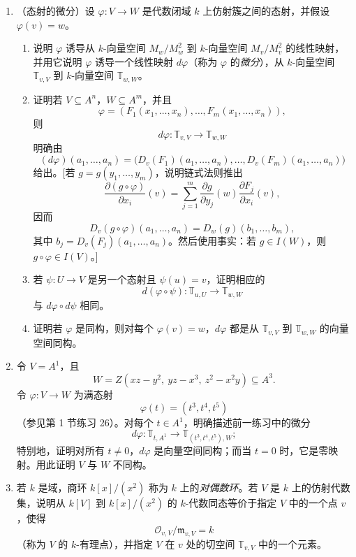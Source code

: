 \begin{enumerate}[label=\arabic*.]
	\item （态射的微分）设 $\varphi:V\to W$ 是代数闭域 $k$ 上仿射簇之间的态射，并假设 $\varphi(v)=w$。
	\begin{enumerate}[label=(\alph*)]
		\item 说明 $\varphi$ 诱导从 $k$-向量空间 $M_w/M_w^2$ 到 $k$-向量空间 $M_v/M_v^2$ 的线性映射，并用它说明 $\varphi$ 诱导一个线性映射 $d\varphi$（称为 $\varphi$ 的\emph{微分}），从 $k$-向量空间 $\mathbb T_{v,V}$ 到 $k$-向量空间 $\mathbb T_{w,W}$。
		\item 证明若 $V\subseteq A^n$，$W\subseteq A^m$，并且
		\[
		\varphi=(F_1(x_1,\ldots,x_n),\ldots,F_m(x_1,\ldots,x_n)),
		\]
		则
		\[
		d\varphi:\mathbb T_{v,V}\longrightarrow\mathbb T_{w,W}
		\]
		明确由
		\[
		(d\varphi)(a_1,
		\ldots,a_n)=
		\bigl(D_v(F_1)(a_1,
		\ldots,a_n),
		\ldots,
		D_v(F_m)(a_1,
		\ldots,a_n)\bigr)
		\]
		给出。[若 $g=g(y_1,
		\ldots,y_m)$，说明链式法则推出
		\[
		\frac{\partial(g\circ\varphi)}{\partial x_i}(v)
		=\sum_{j=1}^m
		\frac{\partial g}{\partial y_j}(w)
		\frac{\partial F_j}{\partial x_i}(v),
		\]
		因而
		\[
		D_v(g\circ\varphi)(a_1,
		\ldots,a_n)=D_w(g)(b_1,
		\ldots,b_m),
		\]
		其中 $b_j=D_v(F_j)(a_1,
		\ldots,a_n)$。然后使用事实：若 $g\in I(W)$，则 $g\circ\varphi\in I(V)$。]
		\item 若 $\psi:U\to V$ 是另一个态射且 $\psi(u)=v$，证明相应的
		\[
		d(\varphi\circ\psi):\mathbb T_{u,U}\to\mathbb T_{w,W}
		\]
		与 $d\varphi\circ d\psi$ 相同。
		\item 证明若 $\varphi$ 是同构，则对每个 $\varphi(v)=w$，$d\varphi$ 都是从 $\mathbb T_{v,V}$ 到 $\mathbb T_{w,W}$ 的向量空间同构。
	\end{enumerate}
	
	\item 令 $V=A^1$，且
	\[
	W=Z(xz-y^2,\ yz-x^3,\ z^2-x^2y)\subseteq A^3.
	\]
	令 $\varphi:V\to W$ 为满态射
	\[
	\varphi(t)=(t^3,t^4,t^5)
	\]
	（参见第 1 节练习 26）。对每个 $t\in A^1$，明确描述前一练习中的微分
	\[
	d\varphi:\mathbb T_{t,A^1}\to\mathbb T_{(t^3,t^4,t^5),W};
	\]
	特别地，证明对所有 $t\ne0$，$d\varphi$ 是向量空间同构；而当 $t=0$ 时，它是零映射。用此证明 $V$ 与 $W$ 不同构。
	
	\item 若 $k$ 是域，商环 $k[x]/(x^2)$ 称为 $k$ 上的\emph{对偶数环}。若 $V$ 是 $k$ 上的仿射代数集，说明从 $k[V]$ 到 $k[x]/(x^2)$ 的 $k$-代数同态等价于指定 $V$ 中的一个点 $v$，使得
	\[
	\mathcal O_{v,V}/\mathfrak m_{v,V}=k
	\]
	（称为 $V$ 的 $k$-有理点），并指定 $V$ 在 $v$ 处的切空间 $\mathbb T_{v,V}$ 中的一个元素。
	

\end{enumerate}
